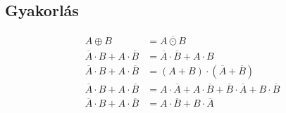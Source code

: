 \documentclass{article}
\begin{document}
\subsection{Gyakorlás}
\begin{align*}
    A \oplus B                                  & = \overline{A \odot B}                                 \\
    \overline{A} \cdot B + A \cdot \overline{B} & = \overline{A} \cdot \overline{B} + A \cdot B          \\
    \overline{A} \cdot B + A \cdot \overline{B} & =
    (A + B) \cdot (\overline{A} + \overline{B})                                                          \\
    \overline{A} \cdot B + A \cdot \overline{B} & =
    A \cdot \overline{A} + A \cdot \overline{B} + \overline{B} \cdot \overline{A} + B \cdot \overline{B} \\
    \overline{A} \cdot B + A \cdot \overline{B} & =
    A \cdot \overline{B} + B \cdot \overline{A}                                                          \\
\end{align*}
\end{document}
